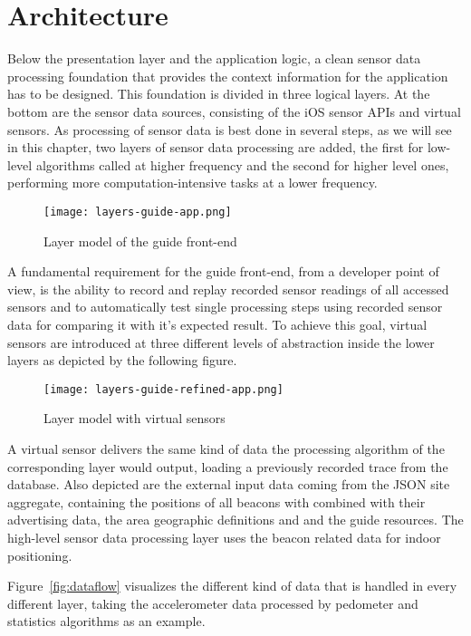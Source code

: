 \section{Architecture}

Below the presentation layer and the application logic, a clean sensor data processing foundation that provides the context information for the application has to be designed. This foundation is divided in three logical layers. At the bottom are the sensor data sources, consisting of the iOS sensor APIs and virtual sensors. As processing of sensor data is best done in several steps, as we will see in this chapter, two layers of sensor data processing are added, the first for low-level  algorithms called at higher frequency and the second for higher level ones, performing more computation-intensive tasks at a lower frequency.  

\begin{figure}[H]
\centering
\texttt{[image: layers-guide-app.png]}
\caption{Layer model of the guide front-end}
\end{figure}

A fundamental requirement for the guide front-end, from a developer point of view, is the ability to record and replay recorded sensor readings of all accessed sensors and to automatically test single processing steps using recorded sensor data for comparing it with it's expected result.
To achieve this goal, virtual sensors are introduced at three different levels of abstraction inside the lower layers as depicted by the following figure.
 
\begin{figure}[H]
\centering
\texttt{[image: layers-guide-refined-app.png]}
\caption{Layer model with virtual sensors}
\end{figure} 

A virtual sensor delivers the same kind of data the processing algorithm of the corresponding layer would output, loading a previously recorded trace from the database. 
Also depicted are the external input data coming from the JSON site aggregate, containing the positions of all beacons with combined with their advertising data, the area geographic definitions and and the guide resources. The high-level sensor data processing layer uses the beacon related data for indoor positioning.

Figure~\ref{fig:dataflow} visualizes the different kind of data that is handled in every different layer, taking the accelerometer data processed by pedometer and statistics algorithms as an example. 

